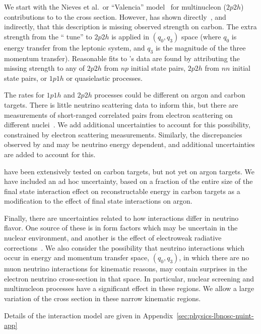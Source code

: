 We start with the Nieves et al.\ or ``Valencia'' model~\cite{nieves1,nieves2} for multinucleon ($2p2h$) contributions to to the cross section.  However,  has shown directly~\cite{Rodrigues:2015hik}, and  indirectly, that this description is missing observed strength on carbon. The extra strength from the `` tune'' to $2p2h$ is applied in $(q_0,q_3)$ space (where $q_0$ is energy transfer from the leptonic system, and $q_3$ is the magnitude of the three momentum transfer). Reasonable fits to 's data are found by attributing the missing strength to any of $2p2h$ from $np$ initial state pairs, $2p2h$ from $nn$ initial state pairs, or $1p1h$ or quasielastic processes.  

The rates for $1p1h$ and $2p2h$ processes could be different on argon and carbon targets.  There is little neutrino scattering data to inform this, but there are measurements of short-ranged correlated pairs from electron scattering on different nuclei~\cite{Colle:2015ena}.   We add additional uncertainties to account for this possibility, constrained by electron scattering measurements.  Similarly, the discrepancies observed by  and  may be neutrino energy dependent, and additional uncertainties are added to account for this.

 have been extensively tested on carbon targets, but not yet on argon targets.  We have included an ad hoc uncertainty, based on a fraction of the entire size of the final state interaction effect on reconstructable energy in carbon targets as a modification to the effect of final state interactions on argon.

Finally, there are uncertainties related to how interactions differ in neutrino flavor.  One source of these is in form factors which may be uncertain in the nuclear environment, and another is the effect of electroweak radiative corrections~\cite{Day-McFarland:2012}.  We also consider the possibility that neutrino interactions which occur in energy and momentum transfer space, $(q_0,q_3)$, in which there are no muon neutrino interactions for kinematic reasons, may contain surprises in the electron neutrino cross-section in that space.  In particular, nuclear screening and multinucleon processes have a significant effect in these regions.  We allow a large variation of the cross section in these narrow kinematic regions.

Details of the interaction model are given in Appendix~\ref{sec:physics-lbnosc-nuint-app}


